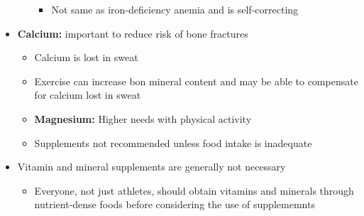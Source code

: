 \documentclass[12pt]{article}
\begin{document}
\begin{itemize}
\begin{itemize}
                            \begin{itemize}
                                \item Not same as iron-deficiency anemia and is self-correcting
                            \end{itemize}
                    \end{itemize}
                \item \textbf{Calcium:} important to reduce risk of bone fractures
                    \begin{itemize}
                        \item Calcium is lost in sweat
                        \item Exercise can increase bon mineral content and may be able to compensate for calcium lost in sweat
                        \item \textbf{Magnesium:} Higher needs with physical activity
                        \item Supplements not recommended unless food intake is inadequate
                    \end{itemize}
                \item Vitamin and mineral supplements are generally not necessary
                    \begin{itemize}
                        \item Everyone, not just athletes, should obtain vitamins and minerals through nutrient-dense foods before considering the use of supplememnts
                    \end{itemize}
            \end{itemize}
        
\end{document}
